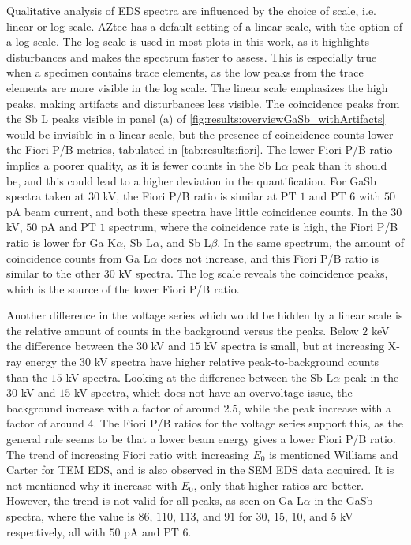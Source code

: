 Qualitative analysis of EDS spectra are influenced by the choice of scale, i.e. linear or log scale.
AZtec has a default setting of a linear scale, with the option of a log scale.
The log scale is used in most plots in this work, as it highlights disturbances and makes the spectrum faster to assess.
This is especially true when a specimen contains trace elements, as the low peaks from the trace elements are more visible in the log scale.
The linear scale emphasizes the high peaks, making artifacts and disturbances less visible.
The coincidence peaks from the Sb L peaks visible in panel (a) of \cref{fig:results:overviewGaSb_withArtifacts} would be invisible in a linear scale, but the presence of coincidence counts lower the Fiori P/B metrics, tabulated in \cref{tab:results:fiori}.
The lower Fiori P/B ratio implies a poorer quality, as it is fewer counts in the Sb L$\alpha$ peak than it should be, and this could lead to a higher deviation in the quantification.
For GaSb spectra taken at $30$ kV, the Fiori P/B ratio is similar at PT $1$ and PT $6$ with $50$ pA beam current, and both these spectra have little coincidence counts.
In the $30$ kV, $50$ pA and PT $1$ spectrum, where the coincidence rate is high, the Fiori P/B ratio is lower for Ga K$\alpha$, Sb L$\alpha$, and Sb L$\beta$.
In the same spectrum, the amount of coincidence counts from Ga L$\alpha$ does not increase, and this Fiori P/B ratio is similar to the other $30$ kV spectra.
The log scale reveals the coincidence peaks, which is the source of the lower Fiori P/B ratio.


Another difference in the voltage series which would be hidden by a linear scale is the relative amount of counts in the background versus the peaks.
Below $2$ keV the difference between the $30$ kV and $15$ kV spectra is small, but at increasing X-ray energy the $30$ kV spectra have higher relative peak-to-background counts than the $15$ kV spectra.
Looking at the difference between the Sb L$\alpha$ peak in the $30$ kV and $15$ kV spectra, which does not have an overvoltage issue, the background increase with a factor of around $2.5$, while the peak increase with a factor of around $4$.
The Fiori P/B ratios for the voltage series support this, as the general rule seems to be that a lower beam energy gives a lower Fiori P/B ratio.
The trend of increasing Fiori ratio with increasing $E_0$ is mentioned Williams and Carter \cite[p. 614]{williams_carter_tem_2009} for TEM EDS, and is also observed in the SEM EDS data acquired.
It is not mentioned why it increase with $E_0$, only that higher ratios are better.
However, the trend is not valid for all peaks, as seen on Ga L$\alpha$ in the GaSb spectra, where the value is $86$, $110$, $113$, and $91$ for $30$, $15$, $10$, and $5$ kV respectively, all with $50$ pA and PT $6$.


